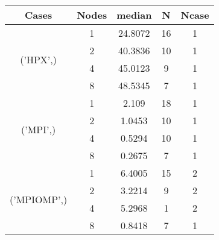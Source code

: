 \begin{tabular}{ccccc}
\hline
Cases & Nodes& median & N & Ncase \\
\hline
\multirow{4}{*}{('HPX',)}& 1& 24.8072& 16& 1\\
& 2& 40.3836& 10& 1\\
& 4& 45.0123& 9& 1\\
& 8& 48.5345& 7& 1\\
\hline
\multirow{4}{*}{('MPI',)}& 1& 2.109& 18& 1\\
& 2& 1.0453& 10& 1\\
& 4& 0.5294& 10& 1\\
& 8& 0.2675& 7& 1\\
\hline
\multirow{4}{*}{('MPIOMP',)}& 1& 6.4005& 15& 2\\
& 2& 3.2214& 9& 2\\
& 4& 5.2968& 1& 2\\
& 8& 0.8418& 7& 1\\
\hline
\end{tabular}
